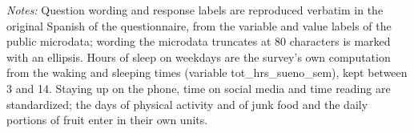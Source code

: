 \begin{table}[htbp]
\begin{threeparttable}
\begin{tabular}{@{}p{68pt}p{212pt}p{150pt}@{}}
\bottomrule
\end{tabular}
\begin{wpnotes}
\textit{Notes:} Question wording and response labels are reproduced verbatim in the original Spanish of the questionnaire, from the variable and value labels of the public microdata; wording the microdata truncates at 80 characters is marked with an ellipsis. Hours of sleep on weekdays are the survey's own computation from the waking and sleeping times (variable tot\_hrs\_sueno\_sem), kept between 3 and 14. Staying up on the phone, time on social media and time reading are standardized; the days of physical activity and of junk food and the daily portions of fruit enter in their own units.
\end{wpnotes}
\end{threeparttable}
\end{table}
